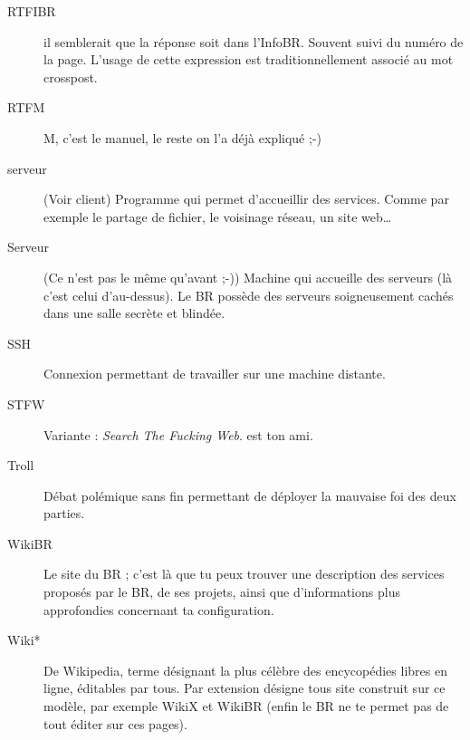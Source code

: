 \begin{description}
  \item[RTFIBR] il semblerait que la réponse soit dans l'InfoBR. Souvent suivi du numéro de la page. L'usage de cette expression est traditionnellement associé au mot crosspost.
  \item[RTFM] M, c'est le manuel, le reste on l'a déjà expliqué ;-)
  \item[serveur] (Voir client) Programme qui permet d'accueillir des services. Comme par exemple le partage de fichier, le voisinage réseau, un site web\ldots\
  \item[Serveur] (Ce n'est pas le même qu'avant ;-)) Machine qui accueille des serveurs (là c'est celui d'au-dessus). Le BR possède des serveurs soigneusement cachés dans une salle secrète et blindée.
  \item[SSH] Connexion permettant de travailler sur une machine distante.
  \item[STFW] Variante : \emph{Search The Fucking Web}.  est ton ami.
  \item[Troll] Débat polémique sans fin permettant de déployer la mauvaise foi des deux parties.
  \item[WikiBR] Le site du BR ; c'est là que tu peux trouver une description des services proposés par le BR, de ses projets, ainsi que
  d'informations plus approfondies concernant ta configuration.
  \item[Wiki*] De Wikipedia, terme d\'esignant la plus c\'el\`ebre des encycop\'edies libres en ligne, \'editables par tous. Par extension d\'esigne tous site construit sur ce mod\`ele, par exemple WikiX et WikiBR (enfin le BR ne te permet pas de tout \'editer sur ces pages).
\end{description}
